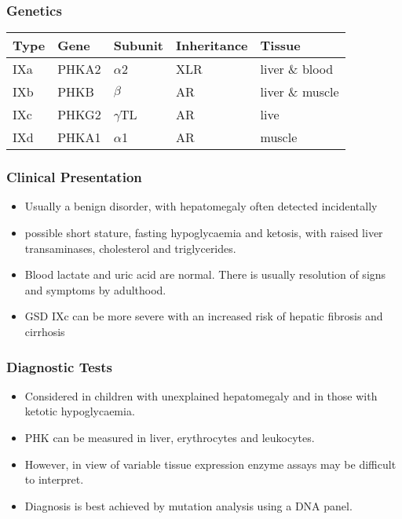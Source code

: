 \documentclass{scrartcl}
\begin{document}
\subsubsection{Genetics}
\label{sec:orgfe8c65a}
\begin{center}
\begin{tabular}{lllll}
Type & Gene & Subunit & Inheritance & Tissue\\
\hline
IXa & PHKA2 & \(\alpha\)2 & XLR & liver \& blood\\
IXb & PHKB & \(\beta\) & AR & liver \& muscle\\
IXc & PHKG2 & \(\gamma\)TL & AR & live\\
IXd & PHKA1 & \(\alpha\)1 & AR & muscle\\
\end{tabular}
\end{center}

\subsubsection{Clinical Presentation}
\label{sec:org77a3edf}
\begin{itemize}
\item Usually a benign disorder, with hepatomegaly often detected
incidentally
\item possible short stature, fasting hypoglycaemia and ketosis, with
raised liver transaminases, cholesterol and triglycerides.
\item Blood lactate and uric acid are normal. There is usually resolution
of signs and symptoms by adulthood.
\item GSD IXc can be more severe with an increased risk of hepatic fibrosis and cirrhosis
\end{itemize}

\subsubsection{Diagnostic Tests}
\label{sec:org839fc04}
\begin{itemize}
\item Considered in children with unexplained hepatomegaly and in those with ketotic hypoglycaemia.
\item PHK can be measured in liver, erythrocytes and leukocytes.
\item However, in view of variable tissue expression enzyme assays may be
difficult to interpret.
\item Diagnosis is best achieved by mutation analysis using a DNA panel.
\end{itemize}
\end{document}
